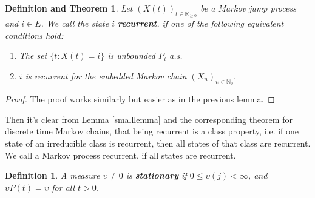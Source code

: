 \documentclass[12pt,a4paper]{scrartcl}
\newtheorem{definition}[theorem]{Definition}
\newtheorem{definitionandtheorem}[theorem]{Definition and Theorem}
\numberwithin{equation}{section}
\newcommand{\R}{\mathbb{R}} %
\newcommand{\N}{\mathbb{N}} %
\begin{document}
\begin{definitionandtheorem}
Let $\left(X\left(t\right)\right)_{t \in \R_{\geq 0}} $ be a Markov jump process and $ i \in E $. We call the state $i$ \textbf{recurrent}, if one of the following equivalent conditions hold:
\begin{enumerate}
\item The set $\lbrace t: X\left(t\right) = i \rbrace  $ is unbounded $P_i$ a.s.
\item $i$ is recurrent for the embedded Markov chain $\left(X_n\right)_{n \in \N_0}. $
\end{enumerate}
\end{definitionandtheorem}
\begin{proof}
The proof works similarly but easier as in the previous lemma.
\end{proof}


Then it's clear from Lemma \ref{smalllemma} and the corresponding theorem for discrete time Markov chains, that being recurrent is a class property, i.e. if one state of an irreducible class is recurrent, then all states of that class are recurrent.
We call a Markov process recurrent, if all states are recurrent.

\begin{definition}
A measure $\upsilon \neq 0$ is \textbf{stationary} if $ 0 \leq \upsilon\left(j\right) < \infty $, and $\upsilon P\left(t\right) = \upsilon $ for all $t > 0$.
\end{definition}
\end{document}
